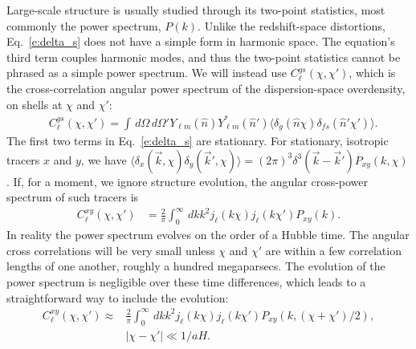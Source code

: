 \documentclass[twocolumn,nofootinbib,prl,floatfix]{revtex4-1}
\newcommand{\ud}{\,d}
\begin{document}
Large-scale structure is usually studied through its two-point statistics, most
commonly the power spectrum, $P(k)$.
Unlike the redshift-space distortions, Eq.~\ref{e:delta_s} does not have a
simple form in harmonic space. The equation's third term couples harmonic
modes,
and thus the two-point statistics cannot be phrased as a simple power spectrum.
We will instead use $C^{gs}_\ell(\chi,\chi')$, which is
the cross-correlation angular power spectrum of the dispersion-space overdensity,
on shells at $\chi$ and $\chi'$:
\begin{align}
    &C^{gs}_\ell(\chi, \chi') =
    \int\ud\Omega\ud\Omega' Y_{\ell m}(\hat n) Y^*_{\ell m}(\hat n')
    \langle \delta_{g}(\hat n \chi) \delta_{fs}(\hat n' \chi')
        \rangle.
\end{align}
The first two terms in Eq.~\ref{e:delta_s} are stationary. For stationary,
isotropic tracers $x$ and $y$, we have 
$\langle \delta_x(\vec k, \chi) \delta_y(\vec k', \chi) \rangle = (2\pi)^3
\delta^3(\vec k - \vec k') P_{xy}(k, \chi)$.  If, for a moment, we ignore
structure evolution, the angular cross-power spectrum of such tracers is
\begin{align}
    C^{xy}_\ell(\chi,\chi')
    &= \frac{2}{\pi}
\int_0^\infty\ud k k^2 j_\ell(k\chi) j_{\ell}(k\chi')P_{xy}(k).
\end{align}
In reality the power spectrum evolves on the order of a Hubble time.
The angular cross correlations will be very small unless $\chi$ and $\chi'$ are
within a few correlation lengths of one another, roughly a hundred
megaparsecs.  The evolution of the power spectrum is negligible over these time
differences, which leads to a straightforward way to include the evolution:
\begin{align}
    C^{xy}_\ell(\chi,\chi') \approx&
        \frac{2}{\pi}
        \int_0^\infty\ud k k^2
        j_\ell(k\chi) j_{\ell}(k\chi')
        P_{xy}(k,(\chi + \chi')/2),\nonumber \\
    &|\chi - \chi'| \ll 1/aH.
\end{align}
\end{document}
